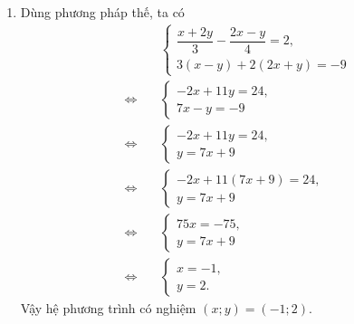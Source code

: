 \begin{bt}[1,5 điểm]
{\begin{enumerate}
\item Dùng phương pháp thế, ta có
\begin{align*}
&\begin{cases}
\dfrac{x+2y}{3}-\dfrac{2x-y}{4}=2,\\
3(x-y)+2(2x+y)=-9
\end{cases}\\[0.7em]
\Leftrightarrow\quad
&\begin{cases}
-2x+11y=24,\\
7x-y=-9
\end{cases}\\[0.7em]
\Leftrightarrow\quad
&\begin{cases}
-2x+11y=24,\\
y=7x+9
\end{cases}\\[0.7em]
\Leftrightarrow\quad
&\begin{cases}
-2x+11(7x+9)=24,\\
y=7x+9
\end{cases}\\[0.7em]
\Leftrightarrow\quad
&\begin{cases}
75x=-75,\\
y=7x+9
\end{cases}\\[0.7em]
\Leftrightarrow\quad
&\begin{cases}
x=-1,\\
y=2.
\end{cases}
\end{align*}
Vậy hệ phương trình có nghiệm $(x;y)=(-1;2)$.
\end{enumerate}
}
\end{bt}



